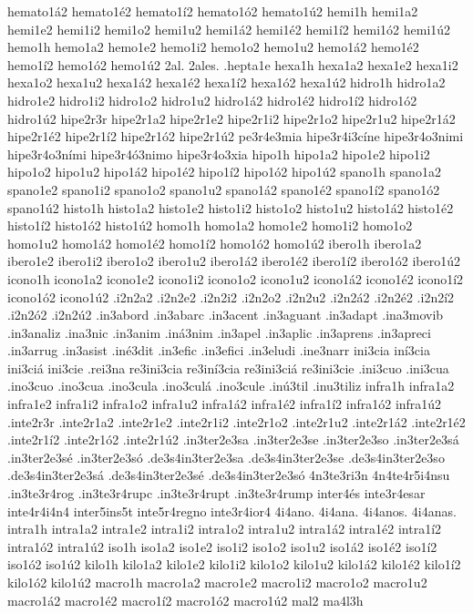 {hemato1á2 hemato1é2 hemato1í2 hemato1ó2 hemato1ú2
hemi1h
hemi1a2 hemi1e2 hemi1i2 hemi1o2 hemi1u2
hemi1á2 hemi1é2 hemi1í2 hemi1ó2 hemi1ú2
hemo1h
hemo1a2 hemo1e2 hemo1i2 hemo1o2 hemo1u2
hemo1á2 hemo1é2 hemo1í2 hemo1ó2 hemo1ú2
2al.
2ales.
.hepta1e
hexa1h
hexa1a2 hexa1e2 hexa1i2 hexa1o2 hexa1u2
hexa1á2 hexa1é2 hexa1í2 hexa1ó2 hexa1ú2
hidro1h
hidro1a2 hidro1e2 hidro1i2 hidro1o2 hidro1u2
hidro1á2 hidro1é2 hidro1í2 hidro1ó2 hidro1ú2
hipe2r3r
hipe2r1a2 hipe2r1e2 hipe2r1i2 hipe2r1o2 hipe2r1u2
hipe2r1á2 hipe2r1é2 hipe2r1í2 hipe2r1ó2 hipe2r1ú2
pe3r4e3mia
hipe3r4i3cíne
hipe3r4o3nimi
hipe3r4o3ními
hipe3r4ó3nimo
hipe3r4o3xia
hipo1h
hipo1a2 hipo1e2 hipo1i2 hipo1o2 hipo1u2
hipo1á2 hipo1é2 hipo1í2 hipo1ó2 hipo1ú2
spano1h
spano1a2 spano1e2 spano1i2 spano1o2 spano1u2
spano1á2 spano1é2 spano1í2 spano1ó2 spano1ú2
histo1h
histo1a2 histo1e2 histo1i2 histo1o2 histo1u2
histo1á2 histo1é2 histo1í2 histo1ó2 histo1ú2
homo1h
homo1a2 homo1e2 homo1i2 homo1o2 homo1u2
homo1á2 homo1é2 homo1í2 homo1ó2 homo1ú2
ibero1h
ibero1a2 ibero1e2 ibero1i2 ibero1o2 ibero1u2
ibero1á2 ibero1é2 ibero1í2 ibero1ó2 ibero1ú2
icono1h
icono1a2 icono1e2 icono1i2 icono1o2 icono1u2
icono1á2 icono1é2 icono1í2 icono1ó2 icono1ú2
.i2n2a2 .i2n2e2 .i2n2i2 .i2n2o2 .i2n2u2
.i2n2á2 .i2n2é2 .i2n2í2 .i2n2ó2 .i2n2ú2
.in3abord
.in3abarc
.in3acent
.in3aguant
.in3adapt
.ina3movib
.in3analiz
.ina3nic
.in3anim
.iná3nim
.in3apel
.in3aplic
.in3aprens
.in3apreci
.in3arrug
.in3asist
.iné3dit
.in3efic
.in3efici
.in3eludi
.ine3narr
ini3cia
iní3cia
ini3ciá
ini3cie
.rei3na
re3ini3cia
re3iní3cia
re3ini3ciá
re3ini3cie
.ini3cuo
.ini3cua
.ino3cuo
.ino3cua
.ino3cula
.ino3culá
.ino3cule
.inú3til
.inu3tiliz
infra1h
infra1a2 infra1e2 infra1i2 infra1o2 infra1u2
infra1á2 infra1é2 infra1í2 infra1ó2 infra1ú2
.inte2r3r
.inte2r1a2 .inte2r1e2 .inte2r1i2 .inte2r1o2 .inte2r1u2
.inte2r1á2 .inte2r1é2 .inte2r1í2 .inte2r1ó2 .inte2r1ú2
.in3ter2e3sa
.in3ter2e3se
.in3ter2e3so
.in3ter2e3sá
.in3ter2e3sé
.in3ter2e3só
.de3s4in3ter2e3sa
.de3s4in3ter2e3se
.de3s4in3ter2e3so
.de3s4in3ter2e3sá
.de3s4in3ter2e3sé
.de3s4in3ter2e3só
4n3te3ri3n
4n4te4r5i4nsu
.in3te3r4rog
.in3te3r4rupc
.in3te3r4rupt
.in3te3r4rump
inter4és
inte3r4esar
inte4r4i4n4
inter5ins5t
inte5r4regno
inte3r4ior4
4i4ano.
4i4ana.
4i4anos.
4i4anas.
intra1h
intra1a2 intra1e2 intra1i2 intra1o2 intra1u2
intra1á2 intra1é2 intra1í2 intra1ó2 intra1ú2
iso1h
iso1a2 iso1e2 iso1i2 iso1o2 iso1u2
iso1á2 iso1é2 iso1í2 iso1ó2 iso1ú2
kilo1h
kilo1a2 kilo1e2 kilo1i2 kilo1o2 kilo1u2
kilo1á2 kilo1é2 kilo1í2 kilo1ó2 kilo1ú2
macro1h
macro1a2 macro1e2 macro1i2 macro1o2 macro1u2
macro1á2 macro1é2 macro1í2 macro1ó2 macro1ú2
mal2
ma4l3h
}
